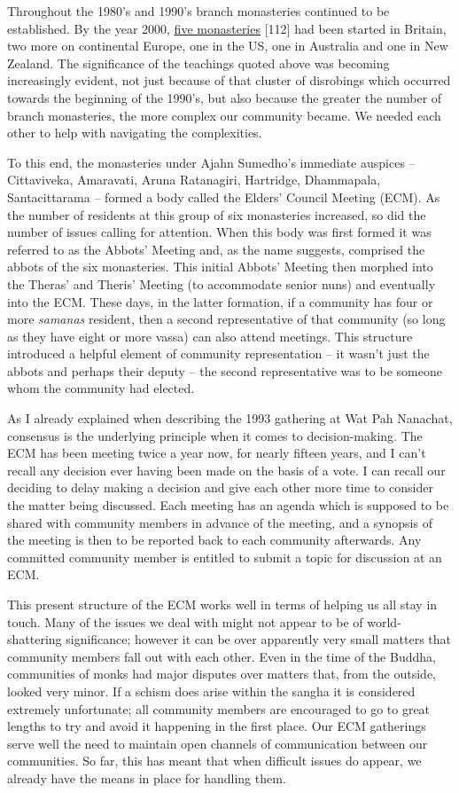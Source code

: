 Throughout the 1980's and 1990's branch monasteries continued to be
established. By the year 2000,
\href{https://forestsangha.org/community/monasteries}{\underline{five
monasteries}} {[}112{]} had been started in Britain, two more on
continental Europe, one in the US, one in Australia and one in New
Zealand. The significance of the teachings quoted above was becoming
increasingly evident, not just because of that cluster of disrobings
which occurred towards the beginning of the 1990's, but also because the
greater the number of branch monasteries, the more complex our community
became. We needed each other to help with navigating the complexities.

To this end, the monasteries under Ajahn Sumedho's immediate auspices --
Cittaviveka, Amaravati, Aruna Ratanagiri, Hartridge, Dhammapala,
Santacittarama -- formed a body called the Elders' Council Meeting
(ECM). As the number of residents at this group of six monasteries
increased, so did the number of issues calling for attention. When this
body was first formed it was referred to as the Abbots' Meeting and, as
the name suggests, comprised the abbots of the six monasteries. This
initial Abbots' Meeting then morphed into the Theras' and Theris'
Meeting (to accommodate senior nuns) and eventually into the ECM. These
days, in the latter formation, if a community has four or more
\emph{samanas} resident, then a second representative of that community
(so long as they have eight or more vassa) can also attend meetings.
This structure introduced a helpful element of community representation
-- it wasn't just the abbots and perhaps their deputy -- the second
representative was to be someone whom the community had elected.

As I already explained when describing the 1993 gathering at Wat Pah
Nanachat, consensus is the underlying principle when it comes to
decision-making. The ECM has been meeting twice a year now, for nearly
fifteen years, and I can't recall any decision ever having been made on
the basis of a vote. I can recall our deciding to delay making a
decision and give each other more time to consider the matter being
discussed. Each meeting has an agenda which is supposed to be shared
with community members in advance of the meeting, and a synopsis of the
meeting is then to be reported back to each community afterwards. Any
committed community member is entitled to submit a topic for discussion
at an ECM.

This present structure of the ECM works well in terms of helping us all
stay in touch. Many of the issues we deal with might not appear to be of
world-shattering significance; however it can be over apparently very
small matters that community members fall out with each other. Even in
the time of the Buddha, communities of monks had major disputes over
matters that, from the outside, looked very minor. If a schism does
arise within the sangha it is considered extremely unfortunate; all
community members are encouraged to go to great lengths to try and avoid
it happening in the first place. Our ECM gatherings serve well the need
to maintain open channels of communication between our communities. So
far, this has meant that when difficult issues do appear, we already
have the means in place for handling them.

